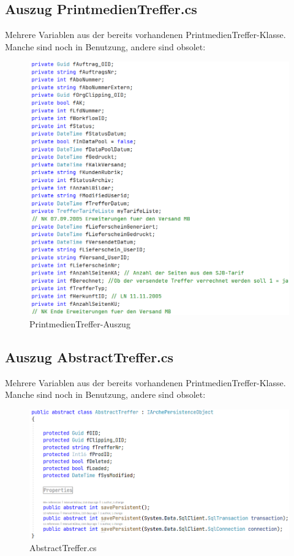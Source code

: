 \documentclass[11pt,toc=sectionentrywithoutdots, 
headheight=44pt, headings=optiontoheadandtoc, hyperfootnotes=false, hypertexnames=false]{scrartcl}
\begin{document}
 \subsection{Auszug PrintmedienTreffer.cs}
 \label{fig:PrintmedienTreffer.cs}
Mehrere Variablen aus der bereits vorhandenen PrintmedienTreffer-Klasse. Manche sind noch in Benutzung, andere sind obsolet:
 \begin{figure}[htp]
 \centering

	\includegraphics[scale=0.7]{PrintmedienTreffer.png}
	 \caption{PrintmedienTreffer-Auszug}
 \end{figure}
 \clearpage
 
  \subsection{Auszug AbstractTreffer.cs}
 \label{fig:AbstractTreffer.cs}
Mehrere Variablen aus der bereits vorhandenen PrintmedienTreffer-Klasse. Manche sind noch in Benutzung, andere sind obsolet:
 \begin{figure}[htp]
 \centering

	\includegraphics[scale=0.7]{abstractTreffer.png}
	 \caption{AbstractTreffer.cs}
 \end{figure}
\end{document}
